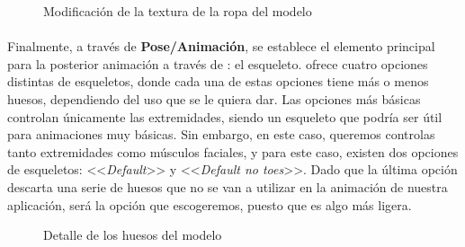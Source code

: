 \documentclass{subfiles}
\begin{document}
    \begin{figure}[H]
    \centering
    \caption{Modificación de la textura de la ropa del modelo}
    \label{fig:4.1.tshirt_change}
    \end{figure}
    
    \paragraph{}
    Finalmente, a través de \textbf{Pose/Animación}, se establece el elemento principal para la posterior animación a través de \blender: el esqueleto. \makehuman ofrece cuatro opciones distintas de esqueletos, donde cada una de estas opciones tiene más o menos huesos, dependiendo del uso que se le quiera dar. Las opciones más básicas controlan únicamente las extremidades, siendo un esqueleto que podría ser útil para animaciones muy básicas. Sin embargo, en este caso, queremos controlas tanto extremidades como músculos faciales, y para este caso, existen dos opciones de esqueletos: <<\textit{Default}>> y <<\textit{Default no toes}>>. Dado que la última opción descarta una serie de huesos que no se van a utilizar en la animación de nuestra aplicación, será la opción que escogeremos, puesto que es algo más ligera.

    \begin{figure}[H]
    \centering
    \caption{Detalle de los huesos del modelo}
    \label{fig:4.1.bones}
    \end{figure}
    
\end{document}
